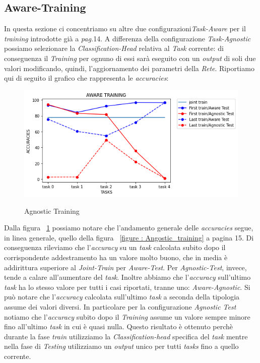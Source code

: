 \subsection{Aware-Training}
In questa sezione ci concentriamo su altre due configurazioni\textit{Task-Aware} per il \textit{training} introdotte già a \textit{pag.}14.
A differenza della configurazione \textit{Task-Agnostic} possiamo selezionare la \textit{Classification-Head} relativa al \textit{Task} corrente: di conseguenza il \textit{Training} per ognuno di essi sarà eseguito con un \textit{output} di soli due valori modificando, quindi, l'aggiornamento dei parametri della \textit{Rete}.\newline
Riportiamo qui di seguito il grafico che rappresenta le \textit{accuracies}:
\begin{figure}[ht]
\centering
\caption{Agnostic Training}
\includegraphics[width=\linewidth]{img/Aware_Agnostic-Aware.png}
\label{figure : Aware_Training}
\end{figure}
\newline
Dalla figura ~\ref{figure : Aware_Training} possiamo notare che l'andamento generale delle \textit{accuracies} segue, in linea generale, quello della figura ~\ref{figure : Angostic_training} a pagina 15.
Di conseguenza rileviamo che l'\textit{accuracy} su un \textit{task} calcolata subito dopo il corrispondente addestramento ha un valore molto buono, che in media è addirittura superiore al \textit{Joint-Train}  per \textit{Aware-Test}. Per \textit{Agnostic-Test}, invece, tende a calare all'aumentare del \textit{task}. Inoltre abbiamo che l'\textit{accuracy} sull'ultimo \textit{task} ha lo stesso valore per tutti i casi riportati, tranne uno: \textit{Aware-Agnostic}. Si può notare che l'\textit{accuracy} calcolata sull'ultimo \textit{task} a seconda della tipologia assume dei valori diversi.
In particolare per la configurazione \textit{Agnostic Test} notiamo che l'\textit{accuracy} subito dopo il \textit{Training} assume un valore sempre minore fino all'ultimo \textit{task} in cui è quasi nulla. Questo risultato è ottenuto perchè durante la fase \textit{train} utilizziamo la \textit{Classification-head} specifica del \textit{task} mentre nella fase di \textit{Testing} utilizziamo un \textit{output} unico per tutti \textit{tasks} fino a quello corrente.
